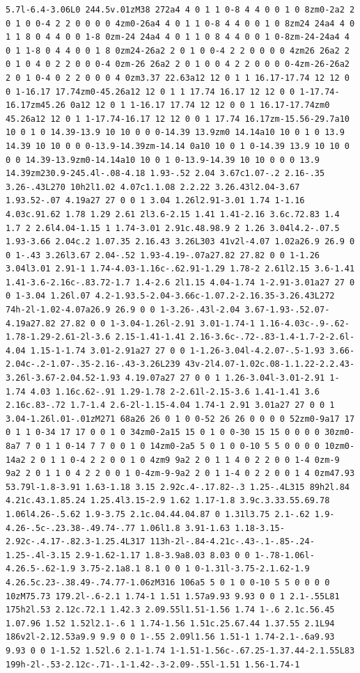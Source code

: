 \documentclass[11pt]{article}
\begin{document}
\begin{enumerate}
\begin{verbatim}
5.7l-6.4-3.06L0 244.5v.01zM38 272a4 4 0 1 1 0-8 4 4 0 0 1 0 8zm0-2a2 2 0 1 0 0-4 2 2 0 0 0 0 4zm0-26a4 4 0 1 1 0-8 4 4 0 0 1 0 8zm24 24a4 4 0 1 1 8 0 4 4 0 0 1-8 0zm-24 24a4 4 0 1 1 0 8 4 4 0 0 1 0-8zm-24-24a4 4 0 1 1-8 0 4 4 0 0 1 8 0zm24-26a2 2 0 1 0 0-4 2 2 0 0 0 0 4zm26 26a2 2 0 1 0 4 0 2 2 0 0 0-4 0zm-26 26a2 2 0 1 0 0 4 2 2 0 0 0 0-4zm-26-26a2 2 0 1 0-4 0 2 2 0 0 0 4 0zm3.37 22.63a12 12 0 1 1 16.17-17.74 12 12 0 0 1-16.17 17.74zm0-45.26a12 12 0 1 1 17.74 16.17 12 12 0 0 1-17.74-16.17zm45.26 0a12 12 0 1 1-16.17 17.74 12 12 0 0 1 16.17-17.74zm0 45.26a12 12 0 1 1-17.74-16.17 12 12 0 0 1 17.74 16.17zm-15.56-29.7a10 10 0 1 0 14.39-13.9 10 10 0 0 0-14.39 13.9zm0 14.14a10 10 0 1 0 13.9 14.39 10 10 0 0 0-13.9-14.39zm-14.14 0a10 10 0 1 0-14.39 13.9 10 10 0 0 0 14.39-13.9zm0-14.14a10 10 0 1 0-13.9-14.39 10 10 0 0 0 13.9 14.39zm230.9-245.4l-.08-4.18 1.93-.52 2.04 3.67c1.07-.2 2.16-.35 3.26-.43L270 10h2l1.02 4.07c1.1.08 2.2.22 3.26.43l2.04-3.67 1.93.52-.07 4.19a27 27 0 0 1 3.04 1.26l2.91-3.01 1.74 1-1.16 4.03c.91.62 1.78 1.29 2.61 2l3.6-2.15 1.41 1.41-2.16 3.6c.72.83 1.4 1.7 2 2.6l4.04-1.15 1 1.74-3.01 2.91c.48.98.9 2 1.26 3.04l4.2-.07.5 1.93-3.66 2.04c.2 1.07.35 2.16.43 3.26L303 41v2l-4.07 1.02a26.9 26.9 0 0 1-.43 3.26l3.67 2.04-.52 1.93-4.19-.07a27.82 27.82 0 0 1-1.26 3.04l3.01 2.91-1 1.74-4.03-1.16c-.62.91-1.29 1.78-2 2.61l2.15 3.6-1.41 1.41-3.6-2.16c-.83.72-1.7 1.4-2.6 2l1.15 4.04-1.74 1-2.91-3.01a27 27 0 0 1-3.04 1.26l.07 4.2-1.93.5-2.04-3.66c-1.07.2-2.16.35-3.26.43L272 74h-2l-1.02-4.07a26.9 26.9 0 0 1-3.26-.43l-2.04 3.67-1.93-.52.07-4.19a27.82 27.82 0 0 1-3.04-1.26l-2.91 3.01-1.74-1 1.16-4.03c-.9-.62-1.78-1.29-2.61-2l-3.6 2.15-1.41-1.41 2.16-3.6c-.72-.83-1.4-1.7-2-2.6l-4.04 1.15-1-1.74 3.01-2.91a27 27 0 0 1-1.26-3.04l-4.2.07-.5-1.93 3.66-2.04c-.2-1.07-.35-2.16-.43-3.26L239 43v-2l4.07-1.02c.08-1.1.22-2.2.43-3.26l-3.67-2.04.52-1.93 4.19.07a27 27 0 0 1 1.26-3.04l-3.01-2.91 1-1.74 4.03 1.16c.62-.91 1.29-1.78 2-2.61l-2.15-3.6 1.41-1.41 3.6 2.16c.83-.72 1.7-1.4 2.6-2l-1.15-4.04 1.74-1 2.91 3.01a27 27 0 0 1 3.04-1.26l.01-.01zM271 68a26 26 0 1 0 0-52 26 26 0 0 0 0 52zm0-9a17 17 0 1 1 0-34 17 17 0 0 1 0 34zm0-2a15 15 0 1 0 0-30 15 15 0 0 0 0 30zm0-8a7 7 0 1 1 0-14 7 7 0 0 1 0 14zm0-2a5 5 0 1 0 0-10 5 5 0 0 0 0 10zm0-14a2 2 0 1 1 0-4 2 2 0 0 1 0 4zm9 9a2 2 0 1 1 4 0 2 2 0 0 1-4 0zm-9 9a2 2 0 1 1 0 4 2 2 0 0 1 0-4zm-9-9a2 2 0 1 1-4 0 2 2 0 0 1 4 0zm47.93 53.79l-1.8-3.91 1.63-1.18 3.15 2.92c.4-.17.82-.3 1.25-.4L315 89h2l.84 4.21c.43.1.85.24 1.25.4l3.15-2.9 1.62 1.17-1.8 3.9c.3.33.55.69.78 1.06l4.26-.5.62 1.9-3.75 2.1c.04.44.04.87 0 1.31l3.75 2.1-.62 1.9-4.26-.5c-.23.38-.49.74-.77 1.06l1.8 3.91-1.63 1.18-3.15-2.92c-.4.17-.82.3-1.25.4L317 113h-2l-.84-4.21c-.43-.1-.85-.24-1.25-.4l-3.15 2.9-1.62-1.17 1.8-3.9a8.03 8.03 0 0 1-.78-1.06l-4.26.5-.62-1.9 3.75-2.1a8.1 8.1 0 0 1 0-1.31l-3.75-2.1.62-1.9 4.26.5c.23-.38.49-.74.77-1.06zM316 106a5 5 0 1 0 0-10 5 5 0 0 0 0 10zM75.73 179.2l-.6-2.1 1.74-1 1.51 1.57a9.93 9.93 0 0 1 2.1-.55L81 175h2l.53 2.12c.72.1 1.42.3 2.09.55l1.51-1.56 1.74 1-.6 2.1c.56.45 1.07.96 1.52 1.52l2.1-.6 1 1.74-1.56 1.51c.25.67.44 1.37.55 2.1L94 186v2l-2.12.53a9.9 9.9 0 0 1-.55 2.09l1.56 1.51-1 1.74-2.1-.6a9.93 9.93 0 0 1-1.52 1.52l.6 2.1-1.74 1-1.51-1.56c-.67.25-1.37.44-2.1.55L83 199h-2l-.53-2.12c-.71-.1-1.42-.3-2.09-.55l-1.51 1.56-1.74-1 
\end{verbatim}
\end{enumerate}
\end{document}
